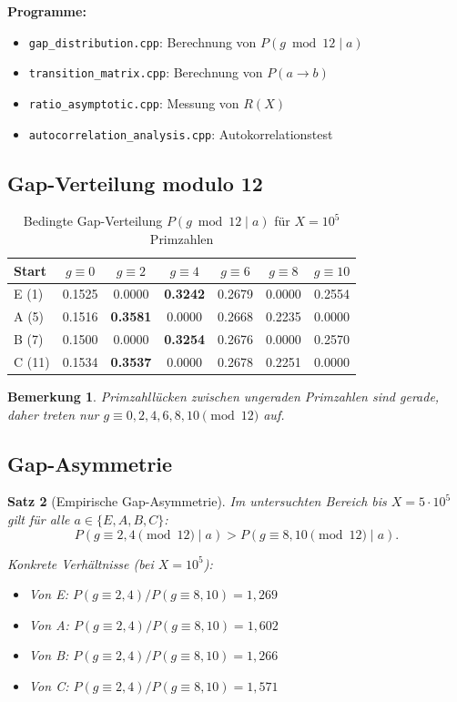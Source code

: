 \documentclass[11pt,a4paper]{article}
\newtheorem{theorem}{Satz}
\newtheorem{remark}[theorem]{Bemerkung}
\begin{document}
\textbf{Programme:}
\begin{itemize}
\item \texttt{gap\_distribution.cpp}: Berechnung von $P(g \bmod 12 \mid a)$
\item \texttt{transition\_matrix.cpp}: Berechnung von $P(a \to b)$
\item \texttt{ratio\_asymptotic.cpp}: Messung von $R(X)$
\item \texttt{autocorrelation\_analysis.cpp}: Autokorrelationstest
\end{itemize}

\subsection{Gap-Verteilung modulo 12}

\begin{table}[h]
\centering
\caption{Bedingte Gap-Verteilung $P(g \bmod 12 \mid a)$ für $X = 10^5$ Primzahlen}
\label{tab:gap-dist}
\begin{tabular}{@{}lcccccc@{}}
\toprule
Start & $g \equiv 0$ & $g \equiv 2$ & $g \equiv 4$ & $g \equiv 6$ & $g \equiv 8$ & $g \equiv 10$ \\ \midrule
E (1)  & 0.1525 & 0.0000 & \textbf{0.3242} & 0.2679 & 0.0000 & 0.2554 \\
A (5)  & 0.1516 & \textbf{0.3581} & 0.0000 & 0.2668 & 0.2235 & 0.0000 \\
B (7)  & 0.1500 & 0.0000 & \textbf{0.3254} & 0.2676 & 0.0000 & 0.2570 \\
C (11) & 0.1534 & \textbf{0.3537} & 0.0000 & 0.2678 & 0.2251 & 0.0000 \\ \bottomrule
\end{tabular}
\end{table}

\begin{remark}
Primzahllücken zwischen ungeraden Primzahlen sind gerade, daher treten nur $g \equiv 0, 2, 4, 6, 8, 10 \pmod{12}$ auf.
\end{remark}

\subsection{Gap-Asymmetrie}

\begin{theorem}[Empirische Gap-Asymmetrie]
\label{thm:gap-asymmetry}
Im untersuchten Bereich bis $X = 5 \cdot 10^5$ gilt für alle $a \in \{E, A, B, C\}$:
\[
P(g \equiv 2,4 \pmod{12} \mid a) > P(g \equiv 8,10 \pmod{12} \mid a).
\]

Konkrete Verhältnisse (bei $X = 10^5$):
\begin{itemize}
\item Von E: $P(g \equiv 2,4) / P(g \equiv 8,10) = 1{,}269$
\item Von A: $P(g \equiv 2,4) / P(g \equiv 8,10) = 1{,}602$
\item Von B: $P(g \equiv 2,4) / P(g \equiv 8,10) = 1{,}266$
\item Von C: $P(g \equiv 2,4) / P(g \equiv 8,10) = 1{,}571$
\end{itemize}
\end{theorem}
\end{document}
